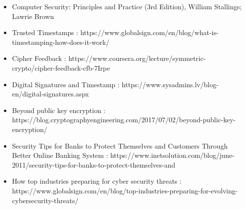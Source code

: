 \documentclass{article}
\begin{document}


\begin{itemize}

\item Computer Security: Principles and Practice (3rd Edition), William Stallings; Lawrie Brown

\item Trusted Timestamps : https://www.globalsign.com/en/blog/what-is-timestamping-how-does-it-work/

\item Cipher Feedback : https://www.coursera.org/lecture/symmetric-crypto/cipher-feedback-cfb-7Irpe

\item Digital Signatures and Timestamp : https://www.sysadmins.lv/blog-en/digital-signatures.aspx

\item Beyond public key encryption : https://blog.cryptographyengineering.com/2017/07/02/beyond-public-key-encryption/

\item Security Tips for Banks to Protect Themselves and Customers Through Better Online Banking System  : https://www.inetsolution.com/blog/june-2011/security-tips-for-banks-to-protect-themselves-and

\item How top industries preparing for cyber security threats : https://www.globalsign.com/en/blog/top-industries-preparing-for-evolving-cybersecurity-threats/

\end{itemize}
\end{document}
